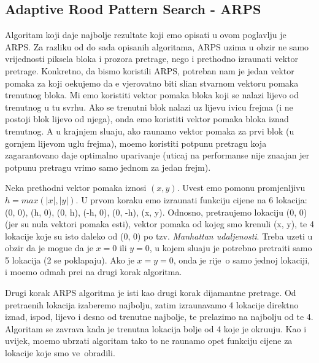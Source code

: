 \subsection{Adaptive Rood Pattern Search - ARPS}
Algoritam koji daje najbolje rezultate koji \cj emo opisati u ovom poglavlju je ARPS. Za razliku od do sada opisanih algoritama, ARPS uzima u obzir ne samo vrijednosti piksela bloka i prozora pretrage, nego i prethodno
izra\ch unati vektor pretrage. Konkretno, da bismo koristili ARPS, potreban nam je jedan vektor pomaka za koji o\ch ekujemo da \cj e vjerovatno biti sli\ch an stvarnom vektoru pomaka trenutnog bloka. Mi \cj emo koristiti
vektor pomaka bloka koji se nalazi lijevo od trenutnog u tu svrhu. Ako se trenutni blok nalazi uz lijevu ivicu frejma (i ne postoji blok lijevo od njega), onda \cj emo koristiti vektor pomaka bloka iznad trenutnog. A u krajnjem
slu\ch aju, ako ra\ch unamo vektor pomaka za prvi blok (u gornjem lijevom uglu frejma), mo\zh emo koristiti potpunu pretragu koja zagarantovano daje optimalno uparivanje (uticaj na performanse nije zna\ch ajan jer
potpunu pretragu vr\sh imo samo jednom za jedan frejm).

Neka prethodni vektor pomaka iznosi $(x, y)$. Uvest \cj emo pomo\cj nu promjenljivu $h=max(|x|,|y|)$. U prvom koraku \cj emo izra\ch unati funkciju cijene na 6 lokacija: (0, 0), (h, 0), (0, h), (-h, 0), (0, -h), (x, y). Odnosno,
pretra\zh ujemo lokaciju (0, 0) (jer su nula vektori pomaka \ch esti), vektor pomaka od kojeg smo krenuli (x, y), te 4 lokacije koje su isto daleko od (0, 0) po tzv. \textit{Manhattan udaljenosti}. Treba uzeti u obzir da je mogu\cj e
da je $x=0$ ili $y=0$, u kojem slu\ch aju je potrebno pretra\zh iti samo 5 lokacija (2 se poklapaju). Ako je $x=y=0$, onda je rije\ch\ o samo jednoj lokaciji, i mo\zh emo odmah pre\cj i na drugi korak algoritma.

Drugi korak ARPS algoritma je isti kao drugi korak dijamantne pretrage. Od pretra\zh enih lokacija izaberemo najbolju, zatim izra\ch unavamo 4 lokacije direktno iznad, ispod, lijevo i desno od trenutne najbolje, te prelazimo
na najbolju od te 4. Algoritam se zavr\sh ava kada je trenutna lokacija bolje od 4 koje je okru\zh uju. Kao i uvijek, mo\zh emo ubrzati algoritam tako \sh to ne ra\ch unamo opet funkciju cijene za lokacije koje smo ve\cj\ 
obradili.

